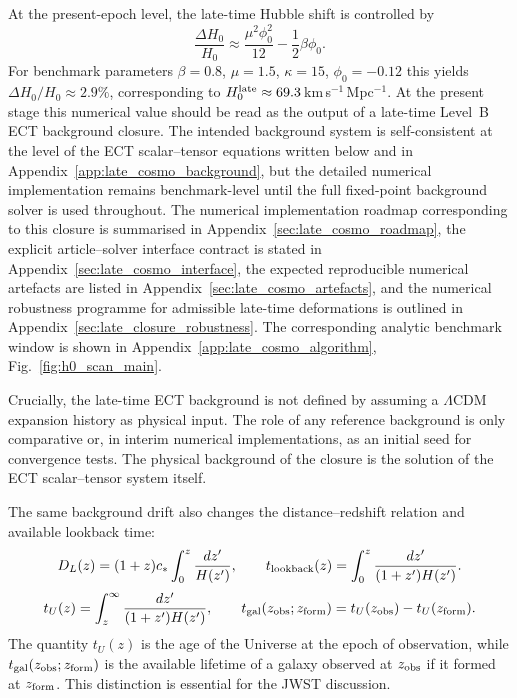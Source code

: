 \documentclass[11pt,a4paper]{article}
\numberwithin{equation}{section}
\begin{document}
At the present-epoch level, the late-time Hubble shift is controlled by
\begin{equation}
\frac{\Delta H_0}{H_0}
\approx
\frac{\mu^2\phi_0^2}{12}
-\frac12\beta \phi_0.
\label{eq:ect_h0_shift_main}
\end{equation}
For benchmark parameters $\beta=0.8$, $\mu=1.5$, $\kappa=15$, $\phi_0=-0.12$
this yields $\Delta H_0/H_0\approx 2.9\%$,
corresponding to $H_0^{\rm late}\approx 69.3$\,km\,s$^{-1}$\,Mpc$^{-1}$.
At the present stage this numerical value should be read as the output
of a late-time Level~B ECT background closure.
The intended background system is self-consistent at the level of the
ECT scalar--tensor equations written below and in
Appendix~\ref{app:late_cosmo_background}, but the detailed numerical
implementation remains benchmark-level until the full fixed-point
background solver is used throughout.
The numerical implementation roadmap corresponding to this closure is
summarised in Appendix~\ref{sec:late_cosmo_roadmap}, the explicit
article--solver interface contract is stated in
Appendix~\ref{sec:late_cosmo_interface}, the expected reproducible
numerical artefacts are listed in
Appendix~\ref{sec:late_cosmo_artefacts}, and the numerical robustness
programme for admissible late-time deformations is outlined in
Appendix~\ref{sec:late_closure_robustness}.
The corresponding analytic benchmark window is shown in
Appendix~\ref{app:late_cosmo_algorithm},
Fig.~\ref{fig:h0_scan_main}.

Crucially, the late-time ECT background is not defined by assuming a
$\Lambda$CDM expansion history as physical input.
The role of any reference background is only comparative or, in interim
numerical implementations, as an initial seed for convergence tests.
The physical background of the closure is the solution of the ECT
scalar--tensor system itself.

The same background drift also changes the distance--redshift
relation and available lookback time:
\begin{equation}
D_L(z)=(1+z)c_*\int_0^z \frac{dz'}{H(z')},
\qquad
t_{\rm lookback}(z)=\int_0^z \frac{dz'}{(1+z')H(z')}.
\label{eq:ect_dist_time_main}
\end{equation}
\begin{equation}
t_U(z)=\int_z^\infty \frac{dz'}{(1+z')H(z')},
\qquad
t_{\rm gal}(z_{\rm obs};z_{\rm form})
=
t_U(z_{\rm obs})-t_U(z_{\rm form}).
\label{eq:ect_age_gal_main}
\end{equation}
The quantity $t_U(z)$ is the age of the Universe at the epoch of
observation, while $t_{\rm gal}(z_{\rm obs};z_{\rm form})$ is the
available lifetime of a galaxy observed at $z_{\rm obs}$ if it formed at
$z_{\rm form}$.
This distinction is essential for the JWST discussion.
\end{document}
